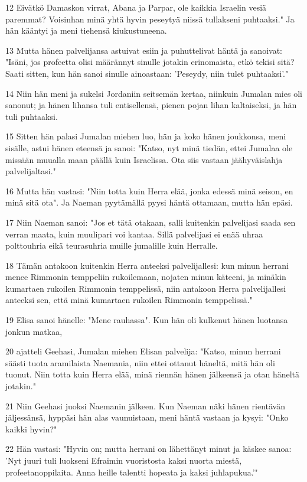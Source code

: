 \par 12 Eivätkö Damaskon virrat, Abana ja Parpar, ole kaikkia Israelin vesiä paremmat? Voisinhan minä yhtä hyvin peseytyä niissä tullakseni puhtaaksi." Ja hän kääntyi ja meni tiehensä kiukustuneena.
\par 13 Mutta hänen palvelijansa astuivat esiin ja puhuttelivat häntä ja sanoivat: "Isäni, jos profeetta olisi määrännyt sinulle jotakin erinomaista, etkö tekisi sitä? Saati sitten, kun hän sanoi sinulle ainoastaan: 'Peseydy, niin tulet puhtaaksi'."
\par 14 Niin hän meni ja sukelsi Jordaniin seitsemän kertaa, niinkuin Jumalan mies oli sanonut; ja hänen lihansa tuli entisellensä, pienen pojan lihan kaltaiseksi, ja hän tuli puhtaaksi.
\par 15 Sitten hän palasi Jumalan miehen luo, hän ja koko hänen joukkonsa, meni sisälle, astui hänen eteensä ja sanoi: "Katso, nyt minä tiedän, ettei Jumalaa ole missään muualla maan päällä kuin Israelissa. Ota siis vastaan jäähyväislahja palvelijaltasi."
\par 16 Mutta hän vastasi: "Niin totta kuin Herra elää, jonka edessä minä seison, en minä sitä ota". Ja Naeman pyytämällä pyysi häntä ottamaan, mutta hän epäsi.
\par 17 Niin Naeman sanoi: "Jos et tätä otakaan, salli kuitenkin palvelijasi saada sen verran maata, kuin muulipari voi kantaa. Sillä palvelijasi ei enää uhraa polttouhria eikä teurasuhria muille jumalille kuin Herralle.
\par 18 Tämän antakoon kuitenkin Herra anteeksi palvelijallesi: kun minun herrani menee Rimmonin temppeliin rukoilemaan, nojaten minun käteeni, ja minäkin kumartaen rukoilen Rimmonin temppelissä, niin antakoon Herra palvelijallesi anteeksi sen, että minä kumartaen rukoilen Rimmonin temppelissä."
\par 19 Elisa sanoi hänelle: "Mene rauhassa". Kun hän oli kulkenut hänen luotansa jonkun matkaa,
\par 20 ajatteli Geehasi, Jumalan miehen Elisan palvelija: "Katso, minun herrani säästi tuota aramilaista Naemania, niin ettei ottanut häneltä, mitä hän oli tuonut. Niin totta kuin Herra elää, minä riennän hänen jälkeensä ja otan häneltä jotakin."
\par 21 Niin Geehasi juoksi Naemanin jälkeen. Kun Naeman näki hänen rientävän jäljessänsä, hyppäsi hän alas vaunuistaan, meni häntä vastaan ja kysyi: "Onko kaikki hyvin?"
\par 22 Hän vastasi: "Hyvin on; mutta herrani on lähettänyt minut ja käskee sanoa: 'Nyt juuri tuli luokseni Efraimin vuoristosta kaksi nuorta miestä, profeetanoppilaita. Anna heille talentti hopeata ja kaksi juhlapukua.'"
